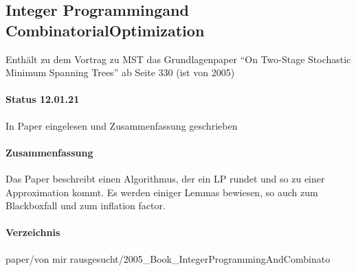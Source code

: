 \documentclass[paper=a4,10pt]{scrartcl}
\begin{document}
\subsection{Integer Programmingand CombinatorialOptimization}
\label{sec:paper_on}
Enthält zu dem Vortrag zu MST das Grundlagenpaper ``On Two-Stage Stochastic Minimum Spanning Trees'' ab Seite 330 (ist von 2005)

\paragraph{Status 12.01.21} In Paper eingelesen und Zusammenfassung geschrieben
\paragraph{Zusammenfassung}	Das Paper beschreibt einen Algorithmus, der ein LP rundet und so zu einer Approximation kommt. Es werden einiger Lemmas bewiesen, so auch zum Blackboxfall und zum inflation factor.
\paragraph{Verzeichnis} paper/von mir rausgesucht/2005\_Book\_IntegerProgrammingAndCombinato
\end{document}
